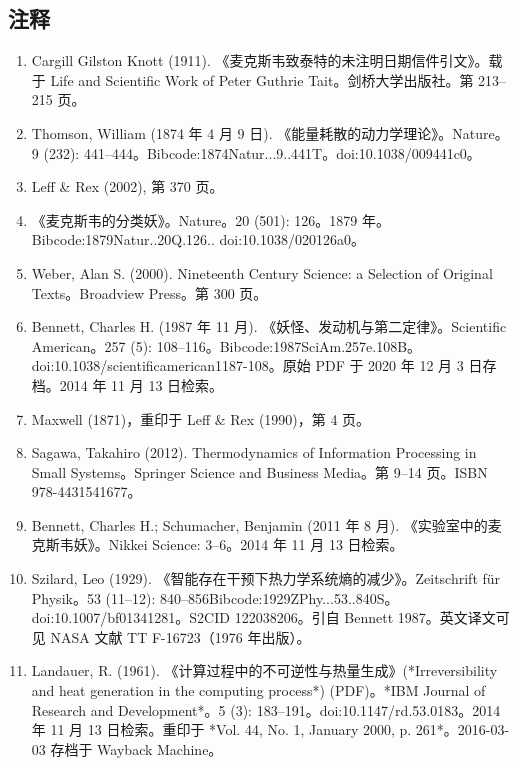 \subsection{注释}
\begin{enumerate}
\item Cargill Gilston Knott (1911). 《麦克斯韦致泰特的未注明日期信件引文》。载于 Life and Scientific Work of Peter Guthrie Tait。剑桥大学出版社。第 213–215 页。
\item Thomson, William (1874 年 4 月 9 日). 《能量耗散的动力学理论》。Nature。9 (232): 441–444。Bibcode:1874Natur...9..441T。doi:10.1038/009441c0。
\item Leff & Rex (2002), 第 370 页。
\item 《麦克斯韦的分类妖》。Nature。20 (501): 126。1879 年。Bibcode:1879Natur..20Q.126.. doi:10.1038/020126a0。
\item Weber, Alan S. (2000). Nineteenth Century Science: a Selection of Original Texts。Broadview Press。第 300 页。
\item Bennett, Charles H. (1987 年 11 月). 《妖怪、发动机与第二定律》。Scientific American。257 (5): 108–116。Bibcode:1987SciAm.257e.108B。doi:10.1038/scientificamerican1187-108。原始 PDF 于 2020 年 12 月 3 日存档。2014 年 11 月 13 日检索。
\item Maxwell (1871)，重印于 Leff & Rex (1990)，第 4 页。
\item Sagawa, Takahiro (2012). Thermodynamics of Information Processing in Small Systems。Springer Science and Business Media。第 9–14 页。ISBN 978-4431541677。
\item Bennett, Charles H.; Schumacher, Benjamin (2011 年 8 月). 《实验室中的麦克斯韦妖》。Nikkei Science: 3–6。2014 年 11 月 13 日检索。
\item Szilard, Leo (1929). 《智能存在干预下热力学系统熵的减少》。Zeitschrift für Physik。53 (11–12): 840–856Bibcode:1929ZPhy...53..840S。doi:10.1007/bf01341281。S2CID 122038206。引自 Bennett 1987。英文译文可见 NASA 文献 TT F-16723（1976 年出版）。



\item Landauer, R. (1961). 《计算过程中的不可逆性与热量生成》(*Irreversibility and heat generation in the computing process*) (PDF)。*IBM Journal of Research and Development*。5 (3): 183–191。doi:10.1147/rd.53.0183。2014 年 11 月 13 日检索。重印于 *Vol. 44, No. 1, January 2000, p. 261*。2016-03-03 存档于 Wayback Machine。


\end{enumerate}
